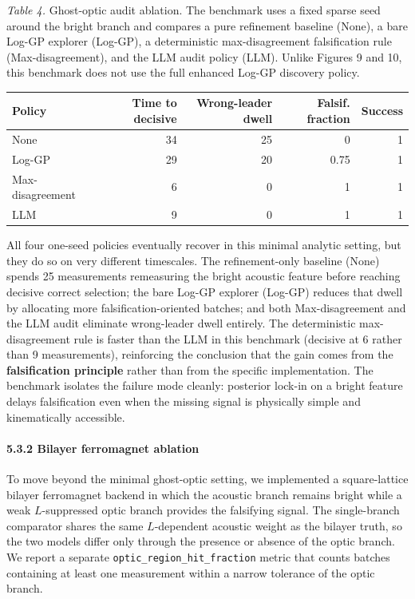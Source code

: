 \documentclass[
]{article}
\begin{document}
\emph{Table 4.} Ghost-optic audit ablation. The benchmark uses a fixed
sparse seed around the bright branch and compares a pure refinement
baseline (None), a bare Log-GP explorer (Log-GP), a deterministic
max-disagreement falsification rule (Max-disagreement), and the LLM
audit policy (LLM). Unlike Figures 9 and 10, this benchmark does not use
the full enhanced Log-GP discovery policy.

\begin{longtable}[]{@{}lrrrr@{}}
\toprule
\textbf{Policy} & \textbf{Time to decisive} & \textbf{Wrong-leader
dwell} & \textbf{Falsif. fraction} & \textbf{Success}\tabularnewline
\midrule
\endhead
None & 34 & 25 & 0 & 1\tabularnewline
Log-GP & 29 & 20 & 0.75 & 1\tabularnewline
Max-disagreement & 6 & 0 & 1 & 1\tabularnewline
LLM & 9 & 0 & 1 & 1\tabularnewline
\bottomrule
\end{longtable}

All four one-seed policies eventually recover in this minimal analytic
setting, but they do so on very different timescales. The
refinement-only baseline (None) spends 25 measurements remeasuring the
bright acoustic feature before reaching decisive correct selection; the
bare Log-GP explorer (Log-GP) reduces that dwell by allocating more
falsification-oriented batches; and both Max-disagreement and the LLM
audit eliminate wrong-leader dwell entirely. The deterministic
max-disagreement rule is faster than the LLM in this benchmark (decisive
at 6 rather than 9 measurements), reinforcing the conclusion that the
gain comes from the \textbf{falsification principle} rather than from
the specific implementation. The benchmark isolates the failure mode
cleanly: posterior lock-in on a bright feature delays falsification even
when the missing signal is physically simple and kinematically
accessible.

\hypertarget{bilayer-ferromagnet-ablation}{%
\paragraph{5.3.2 Bilayer ferromagnet
ablation}\label{bilayer-ferromagnet-ablation}}

To move beyond the minimal ghost-optic setting, we implemented a
square-lattice bilayer ferromagnet backend in which the acoustic branch
remains bright while a weak \(L\)-suppressed optic branch provides the
falsifying signal. The single-branch comparator shares the same
\(L\)-dependent acoustic weight as the bilayer truth, so the two models
differ only through the presence or absence of the optic branch. We
report a separate \texttt{optic\_region\_hit\_fraction} metric that
counts batches containing at least one measurement within a narrow
tolerance of the optic branch.
\end{document}
